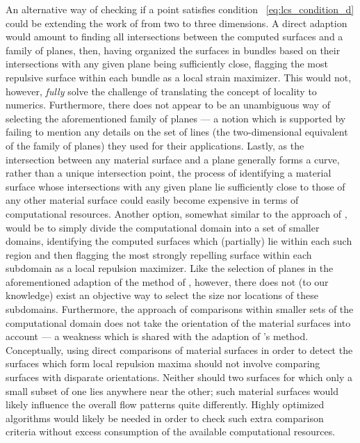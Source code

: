 An alternative way of checking if a point satisfies condition~%
\eqref{eq:lcs_condition_d} could be extending the work of
\textcite{farazmand2012computing} from two to three dimensions. A direct
adaption would amount to finding all intersections between the computed
surfaces and a family of planes, then, having organized the surfaces in bundles
based on their intersections with any given plane being sufficiently close,
flagging the most repulsive surface within each bundle as a local strain
maximizer. This would not, however, \emph{fully} solve the challenge of
translating the concept of locality to numerics. Furthermore, there does not
appear to be an unambiguous way of selecting the aforementioned family of
planes --- a notion which is supported by \textcite{farazmand2012computing}
failing to mention any details on the set of lines (the two-dimensional
equivalent of the family of planes) they used for their applications. Lastly,
as the intersection between any material surface and a plane generally forms a
curve, rather than a unique intersection point, the process of identifying a
material surface whose intersections with any given plane lie sufficiently
close to those of any other material surface could easily become expensive in
terms of computational resources.
\clearpage
Another option, somewhat similar to the approach of
\textcite{farazmand2012computing}, would be to simply divide the computational
domain into a set of smaller domains, identifying the computed surfaces which
(partially) lie within each such region and then flagging the most strongly
repelling surface within each subdomain as a local repulsion maximizer. Like
the selection of planes in the aforementioned adaption of the method of
\citeauthor{farazmand2012computing}, however, there does not (to our knowledge)
exist an objective way to select the size nor locations of these subdomains.
Furthermore, the approach of comparisons within smaller sets of the
computational domain does not take the orientation of the material surfaces
into account --- a weakness which is shared with the adaption of
\citeauthor{farazmand2012computing}'s method. Conceptually, using direct
comparisons of material surfaces in order to detect the surfaces which form
local repulsion maxima should not involve comparing surfaces with disparate
orientations. Neither should two surfaces for which only a small subset of one
lies anywhere near the other; such material surfaces would likely influence the
overall flow patterns quite differently. Highly optimized algorithms would
likely be needed in order to check such extra comparison criteria without
excess consumption of the available computational resources.

